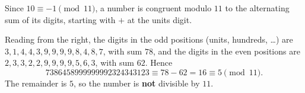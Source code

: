 Since $10\equiv-1\pmod{11}$, a number is congruent modulo $11$ to the alternating sum of its digits, starting with $+$ at the units digit.

Reading from the right, the digits in the odd positions (units, hundreds, \dots) are $3,1,4,4,3,9,9,9,9,8,4,8,7$, with sum $78$, and the digits in the even positions are $2,3,3,2,2,9,9,9,9,5,6,3$, with sum $62$. Hence
\[7386458999999992324343123\equiv78-62=16\equiv5\pmod{11}.\]
The remainder is $5$, so the number is \textbf{not} divisible by $11$.
